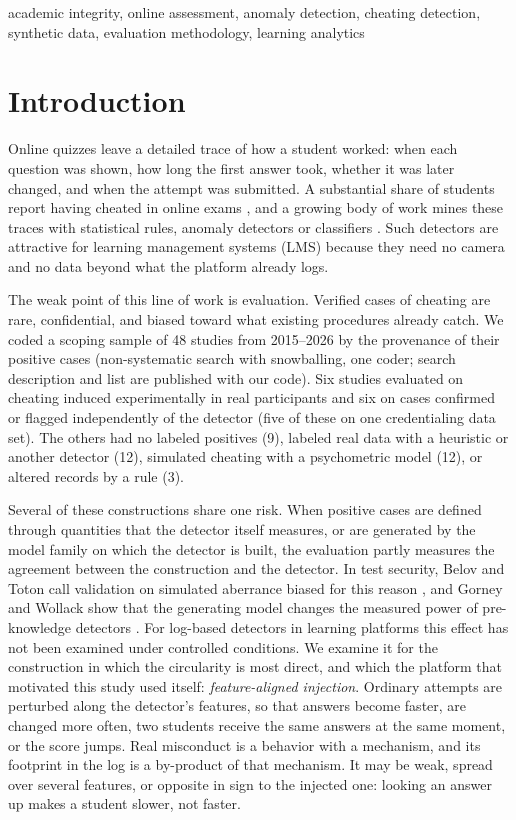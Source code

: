\documentclass[conference,a4paper]{IEEEtran}
\begin{document}
\begin{IEEEkeywords}
academic integrity, online assessment, anomaly detection, cheating detection, synthetic data, evaluation methodology, learning analytics
\end{IEEEkeywords}

\section{Introduction}
Online quizzes leave a detailed trace of how a student worked: when each question was shown, how long the first answer took, whether it was later changed, and when the attempt was submitted. A substantial share of students report having cheated in online exams \cite{newton2024howcommon}, and a growing body of work mines these traces with statistical rules, anomaly detectors or classifiers \cite{noorbehbahani2022review}. Such detectors are attractive for learning management systems (LMS) because they need no camera and no data beyond what the platform already logs.

The weak point of this line of work is evaluation. Verified cases of cheating are rare, confidential, and biased toward what existing procedures already catch. We coded a scoping sample of 48 studies from 2015--2026 by the provenance of their positive cases (non-systematic search with snowballing, one coder; search description and list are published with our code). Six studies evaluated on cheating induced experimentally in real participants and six on cases confirmed or flagged independently of the detector (five of these on one credentialing data set). The others had no labeled positives (9), labeled real data with a heuristic or another detector (12), simulated cheating with a psychometric model (12), or altered records by a rule (3).

Several of these constructions share one risk. When positive cases are defined through quantities that the detector itself measures, or are generated by the model family on which the detector is built, the evaluation partly measures the agreement between the construction and the detector. In test security, Belov and Toton call validation on simulated aberrance biased for this reason \cite{belov2022realdata}, and Gorney and Wollack show that the generating model changes the measured power of pre-knowledge detectors \cite{gorney2022generating}.
For log-based detectors in learning platforms this effect has not been examined under controlled conditions. We examine it for the construction in which the circularity is most direct, and which the platform that motivated this study used itself: \emph{feature-aligned injection}. Ordinary attempts are perturbed along the detector's features, so that answers become faster, are changed more often, two students receive the same answers at the same moment, or the score jumps. Real misconduct is a behavior with a mechanism, and its footprint in the log is a by-product of that mechanism. It may be weak, spread over several features, or opposite in sign to the injected one: looking an answer up makes a student slower, not faster.
\end{document}
